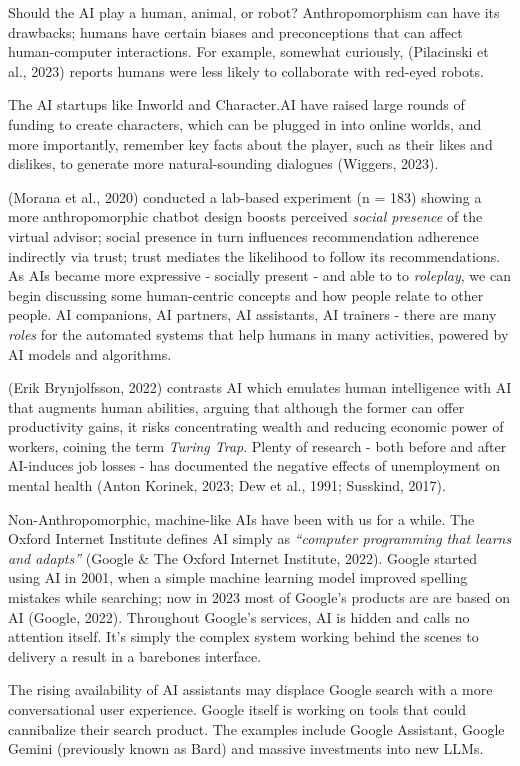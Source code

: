 \documentclass[
  12pt,
  letterpaper,
  DIV=11,
  numbers=noendperiod]{scrartcl}
\begin{document}
Should the AI play a human, animal, or robot? Anthropomorphism can have
its drawbacks; humans have certain biases and preconceptions that can
affect human-computer interactions. For example, somewhat curiously,
(Pilacinski et al., 2023) reports humans were less likely to collaborate
with red-eyed robots.

The AI startups like Inworld and Character.AI have raised large rounds
of funding to create characters, which can be plugged in into online
worlds, and more importantly, remember key facts about the player, such
as their likes and dislikes, to generate more natural-sounding dialogues
(Wiggers, 2023).

(Morana et al., 2020) conducted a lab-based experiment (n = 183) showing
a more anthropomorphic chatbot design boosts perceived \emph{social
presence} of the virtual advisor; social presence in turn influences
recommendation adherence indirectly via trust; trust mediates the
likelihood to follow its recommendations. As AIs became more expressive
- socially present - and able to to \emph{roleplay}, we can begin
discussing some human-centric concepts and how people relate to other
people. AI companions, AI partners, AI assistants, AI trainers - there
are many \emph{roles} for the automated systems that help humans in many
activities, powered by AI models and algorithms.

(Erik Brynjolfsson, 2022) contrasts AI which emulates human intelligence
with AI that augments human abilities, arguing that although the former
can offer productivity gains, it risks concentrating wealth and reducing
economic power of workers, coining the term \emph{Turing Trap}. Plenty
of research - both before and after AI-induces job losses - has
documented the negative effects of unemployment on mental health (Anton
Korinek, 2023; Dew et al., 1991; Susskind, 2017).

Non-Anthropomorphic, machine-like AIs have been with us for a while. The
Oxford Internet Institute defines AI simply as \emph{``computer
programming that learns and adapts''} (Google \& The Oxford Internet
Institute, 2022). Google started using AI in 2001, when a simple machine
learning model improved spelling mistakes while searching; now in 2023
most of Google's products are are based on AI (Google, 2022). Throughout
Google's services, AI is hidden and calls no attention itself. It's
simply the complex system working behind the scenes to delivery a result
in a barebones interface.

The rising availability of AI assistants may displace Google search with
a more conversational user experience. Google itself is working on tools
that could cannibalize their search product. The examples include Google
Assistant, Google Gemini (previously known as Bard) and massive
investments into new LLMs.
\end{document}
